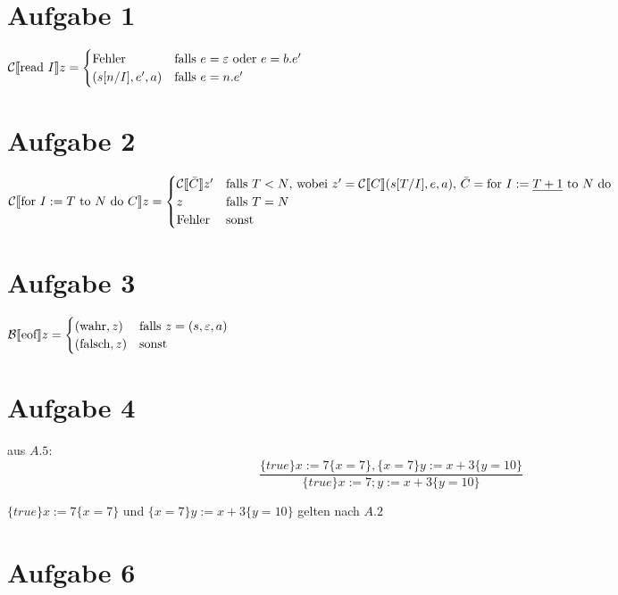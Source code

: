 




\newcommand{\nr}{5}


\section*{Aufgabe 1}
${\mathcal{C}\llbracket\text{read }I\rrbracket} z = 
\begin{cases}
    \text{Fehler} & \text{falls $e=\varepsilon$ oder $e=b.e'$} 
\\
    (s[n/I], e', a) & \text{falls $e=n.e'$}
\end{cases}$

\section*{Aufgabe 2}
${\mathcal{C}\llbracket\text{for } I:=T \text{ to } N \text{ do } C\rrbracket} z = 
\begin{cases}
    {\mathcal{C}\llbracket\bar{C}\rrbracket} z' & \text{falls $T<N$,
                           wobei $z' = {\mathcal{C}\llbracket C\rrbracket}(s[T/I],e,a)$,
                           $\bar{C}=\text{for } I:=\underline{T+1} \text{ to } N \text{ do }$
                        } 
\\
    z & \text{falls $T=N$} 
\\
    \text{Fehler} & \text{sonst}
\end{cases}$

\section*{Aufgabe 3}

${\mathcal{B}\llbracket\text{eof}\rrbracket} z = \begin{cases}
    (\text{wahr},z) & \text{falls $z = (s,\varepsilon,a)$} \\
    (\text{falsch},z) & \text{sonst}
\end{cases}$

\section*{Aufgabe 4}

aus $A.5$:
$$\frac
    { \{true\} x:=7 \{x=7\}, \{x=7\} y:=x+3 \{y=10\} }
    { \{true\} x:=7; y:=x+3 \{y=10\} }
$$

$\{true\} x:=7 \{x=7\}$ und $\{x=7\} y:=x+3 \{y=10\}$ gelten nach $A.2$

\section*{Aufgabe 6}


